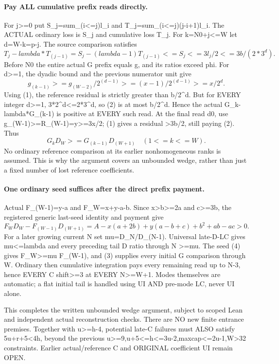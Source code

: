 \paragraph{Pay ALL cumulative prefix reads directly.}
For j>=0 put S_j=sum_(i<=j)l_i and T_j=sum_(i<=j)(j-i+1)l_i.
The ACTUAL ordinary loss is S_j and cumulative loss T_j.
For k=N0+j<=W let d=W-k=p-j. The source comparison satisfies
\[
 T_j-lambda*T_(j-1)=S_j-(lambda-1)T_(j-1)
       <=S_j<=3l_j/2<=3b/(2*3^d).                 \tag{2}
\]
Before N0 the entire actual G prefix equals g, and its ratios exceed phi.
For d>=1, the dyadic bound and the previous numerator unit give
\[
 g_(k-1)>=g_(W-2)/2^(d-1)>=(x-1)/2^(d-1)>=x/2^d.
\]
Using (1), the reference residual is strictly greater than b/2^d.
But for EVERY integer d>=1, 3*2^d<=2*3^d, so (2) is at most b/2^d.
Hence the actual G_k-lambda*G_(k-1) is positive at EVERY such read.
At the final read d0, use g_(W-1)>=R_(W-1)=y>=3x/2;
(1) gives a residual >3b/2, still paying (2). Thus
\[
 G_k D_W>=G_(k-1)D_(W+1)\quad(1<=k<=W).             \tag{3}
\]
No ordinary reference comparison at its earlier nonhomogeneous ranks
is assumed. This is why the argument covers an unbounded wedge,
rather than just a fixed number of lost reference coefficients.

\paragraph{One ordinary seed suffices after the direct prefix payment.}
Actual F_(W-1)=y-a and F_W=x+y-a-b. Since x>b>=2a and c>=3b,
the registered generic last-seed identity and payment give
\[
 F_W D_W-F_(W-1)D_(W+1)
 =A-x(a+2b)+y(a-b+c)+b^2+ab-ac>0.                \tag{4}
\]
For a later growing current N set mu=D_N/D_(N-1). Universal late-D-LC
gives mu<=lambda and every preceding tail D ratio through N >=mu.
The seed (4) gives F_W>=mu F_(W-1), and (3) supplies every initial
G comparison through W. Ordinary then cumulative integration pays
every remaining read up to N-3, hence EVERY C shift>=3 at EVERY N>=W+1.
Modes themselves are automatic; a flat initial tail is handled using
UI AND pre-mode LC, never UI alone.

This completes the written unbounded wedge argument, subject to
scoped Lean and independent actual reconstruction checks. There are
NO new finite entrance premises. Together with u>=h-4, potential
late-C failures must ALSO satisfy 5u+r+5<4h, beyond the previous
u>=9,u+5<=h<=3u-2,maxcap<=2u-1,W>32 constraints.
Earlier actual/reference C and ORIGINAL coefficient UI remain OPEN.

